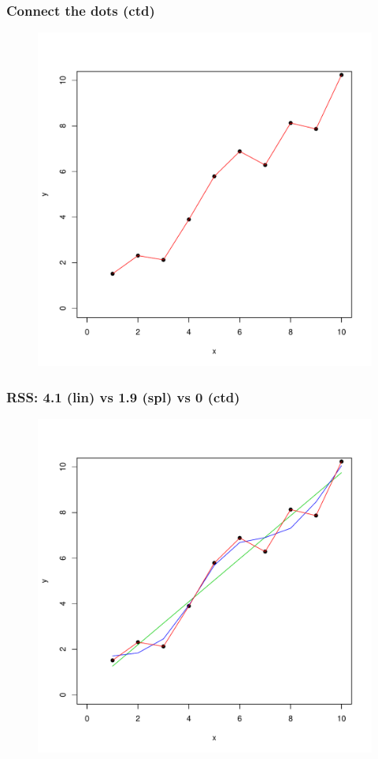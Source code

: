 \documentclass[xcolor=x11names,compress]{beamer}\usepackage[]{graphicx}\usepackage[]{color}
\newenvironment{knitrout}{}{} %
\begin{document}
\begin{frame}[plain]
  \frametitle{Connect the dots (ctd)}
\begin{figure}
\centering
\begin{knitrout}\tiny
{}\color{fgcolor}

{\centering \includegraphics[width=.6\linewidth]{figure/beamer-unnamed-chunk-48-1} 

}



\end{knitrout}
\end{figure}
\end{frame}
\begin{frame}[plain]
  \frametitle{RSS: 4.1 (lin) vs 1.9 (spl) vs 0 (ctd)}
\begin{figure}
\centering
\begin{knitrout}\tiny
{}\color{fgcolor}

{\centering \includegraphics[width=.6\linewidth]{figure/beamer-unnamed-chunk-49-1} 

}



\end{knitrout}
\end{figure}
\end{frame}
\end{document}
